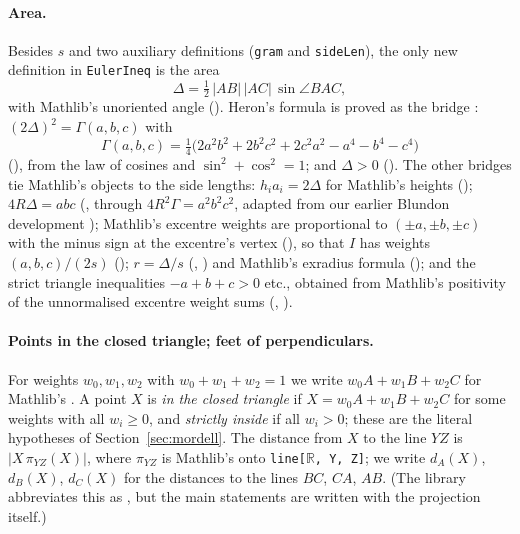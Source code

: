 \documentclass[11pt]{article}
\theoremstyle{definition}
\theoremstyle{remark}
\newcommand{\lean}[1]{\texttt{#1}}
\begin{document}
\paragraph{Area.} Besides $s$ and two auxiliary definitions (\lean{gram} and \lean{sideLen}), the only new definition in \lean{EulerIneq} is the area
\[
\Delta=\tfrac12\,|AB|\,|AC|\,\sin\angle BAC,
\]
with Mathlib's unoriented angle (). Heron's formula is proved as the bridge
: $(2\Delta)^2=\Gamma(a,b,c)$ with
\[
\Gamma(a,b,c)=\tfrac14\bigl(2a^2b^2+2b^2c^2+2c^2a^2-a^4-b^4-c^4\bigr)
\]
(), from the law of cosines and $\sin^2+\cos^2=1$; and $\Delta>0$
(). The other bridges tie Mathlib's objects to the side lengths:
$h_ia_i=2\Delta$ for Mathlib's heights (); $4R\Delta=abc$
(, through $4R^2\Gamma=a^2b^2c^2$, adapted from our
earlier Blundon development \cite{paperD}); Mathlib's excentre weights are proportional to
$(\pm a,\pm b,\pm c)$ with the minus sign at the excentre's vertex
(), so that $I$ has weights $(a,b,c)/(2s)$
(); $r=\Delta/s$ (,
) and Mathlib's exradius formula (); and
the strict triangle inequalities $-a+b+c>0$ etc., obtained from Mathlib's positivity of the
unnormalised excentre weight sums (,
).

\paragraph{Points in the closed triangle; feet of perpendiculars.} For weights $w_0,w_1,w_2$ with
$w_0+w_1+w_2=1$ we write $w_0A+w_1B+w_2C$ for Mathlib's . A point
$X$ is \emph{in the closed triangle} if $X=w_0A+w_1B+w_2C$ for some weights with all $w_i\ge0$, and
\emph{strictly inside} if all $w_i>0$; these are the literal hypotheses of
Section~\ref{sec:mordell}. The distance from $X$ to the line $YZ$ is $|X\,\pi_{YZ}(X)|$, where
$\pi_{YZ}$ is Mathlib's  onto
\lean{line[\(\mathbb{R}\), Y, Z]}; we write $d_A(X)$, $d_B(X)$, $d_C(X)$ for the distances to the
lines $BC$, $CA$, $AB$. (The library abbreviates this as , but the
main statements are written with the projection itself.)
\end{document}
